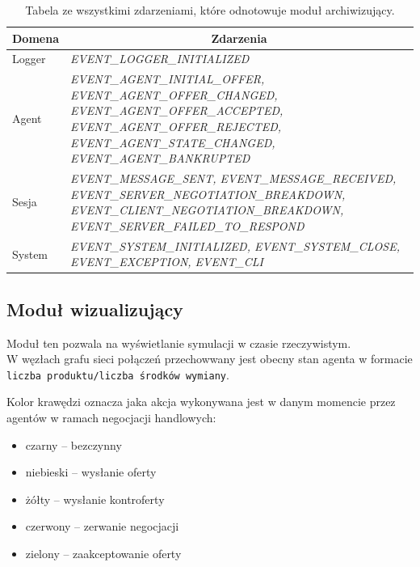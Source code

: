 \documentclass{article}
\begin{document}
\begin{table}[H]
	\begin{tabularx}{1.2\textwidth}{|X|X|}
\hline
\multicolumn{1}{|c|}{\textbf{Domena}} & \multicolumn{1}{c|}{\textbf{Zdarzenia}}                                                                                                                                                                                              \\ \hline
Logger                                & \small\textit{EVENT\_LOGGER\_INITIALIZED}                                                                                                                                                                                                  \\ \hline
Agent                                 & \small\textit{EVENT\_AGENT\_INITIAL\_OFFER, EVENT\_AGENT\_OFFER\_CHANGED, EVENT\_AGENT\_OFFER\_ACCEPTED, EVENT\_AGENT\_OFFER\_REJECTED, EVENT\_AGENT\_STATE\_CHANGED, EVENT\_AGENT\_BANKRUPTED} \\ \hline
Sesja                                 & \small\textit{EVENT\_MESSAGE\_SENT, EVENT\_MESSAGE\_RECEIVED, EVENT\_SERVER\_NEGOTIATION\_BREAKDOWN, EVENT\_CLIENT\_NEGOTIATION\_BREAKDOWN, EVENT\_SERVER\_FAILED\_TO\_RESPOND}               \\ \hline
System                                & \small\textit{EVENT\_SYSTEM\_INITIALIZED, EVENT\_SYSTEM\_CLOSE, EVENT\_EXCEPTION, EVENT\_CLI} \\ \hline
	\end{tabularx}
\caption{Tabela ze wszystkimi zdarzeniami, które odnotowuje moduł archiwizujący.}
\label{events-tab}
\end{table}

\subsection{Moduł wizualizujący}

Moduł ten pozwala na wyświetlanie symulacji w czasie rzeczywistym. \\

W węzłach grafu sieci połączeń przechowwany jest obecny stan agenta w formacie \texttt{liczba produktu/liczba środków wymiany}. 

Kolor krawędzi oznacza jaka akcja wykonywana jest w danym momencie przez agentów w ramach negocjacji handlowych: 

\begin{itemize}
    \item czarny -- bezczynny
    \item niebieski -- wysłanie oferty 
    \item żółty -- wysłanie kontroferty 
    \item czerwony -- zerwanie negocjacji
    \item zielony -- zaakceptowanie oferty 
\end{itemize}
\end{document}
